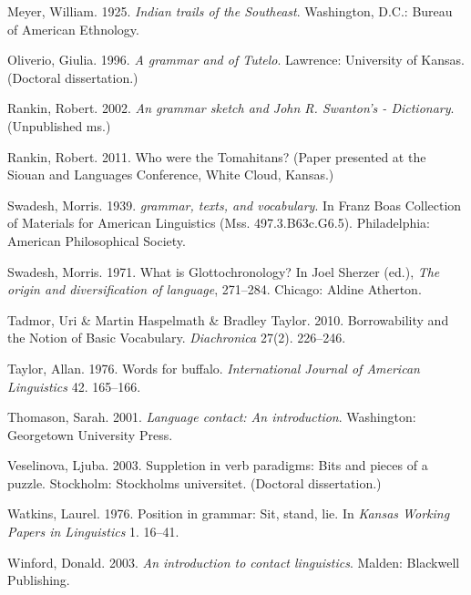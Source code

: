 \documentclass[output=paper]{LSP/langsci}
\begin{document}
\begin{reflist}
Meyer, William. 1925. \emph{Indian trails of the Southeast}. Washington, D.C.: Bureau of American Ethnology.

Oliverio, Giulia. 1996. \emph{A grammar and  of Tutelo}. Lawrence: University of Kansas. (Doctoral dissertation.)

Rankin, Robert. 2002. \emph{An  grammar sketch and John R. Swanton’s - Dictionary}. (Unpublished ms.)

Rankin, Robert. 2011. Who were the Tomahitans? (Paper presented at the Siouan and  Languages Conference, White Cloud, Kansas.)

Swadesh, Morris. 1939. \emph{ grammar, texts, and vocabulary}. In Franz Boas Collection of Materials for American Linguistics (Mss. 497.3.B63c.G6.5). Philadelphia: American Philosophical Society.

Swadesh, Morris. 1971. What is Glottochronology? In Joel Sherzer (ed.), \emph{The origin and diversification of language}, 271--284. Chicago: Aldine Atherton.

Tadmor, Uri \& Martin Haspelmath \& Bradley Taylor. 2010. Borrowability and the Notion of Basic Vocabulary. \emph{Diachronica} 27(2). 226--246.

Taylor, Allan. 1976. Words for buffalo. \emph{International Journal of American Linguistics} 42. 165--166.

Thomason, Sarah. 2001. \emph{Language contact: An introduction}. Washington: Georgetown University Press.

Veselinova, Ljuba. 2003. Suppletion in verb paradigms: Bits and pieces of a puzzle. Stockholm: Stockholms universitet. (Doctoral dissertation.)

Watkins, Laurel. 1976. Position in grammar: Sit, stand, lie. In \emph{Kansas Working Papers in Linguistics} 1. 16--41.

Winford, Donald. 2003. \emph{An introduction to contact linguistics}. Malden: Blackwell Publishing.

\end{reflist}
\end{document}
